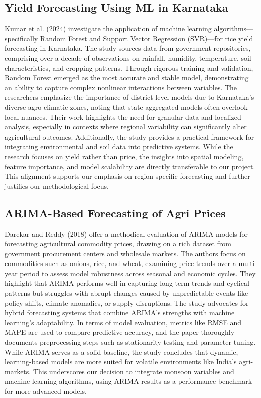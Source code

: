 \subsection{Yield Forecasting Using ML in Karnataka \cite{kumar2024yield}}
Kumar et al. (2024) investigate the application of machine learning algorithms—specifically Random Forest and Support Vector Regression (SVR)—for rice yield forecasting in Karnataka. The study sources data from government repositories, comprising over a decade of observations on rainfall, humidity, temperature, soil characteristics, and cropping patterns. Through rigorous training and validation, Random Forest emerged as the most accurate and stable model, demonstrating an ability to capture complex nonlinear interactions between variables. The researchers emphasize the importance of district-level models due to Karnataka's diverse agro-climatic zones, noting that state-aggregated models often overlook local nuances. Their work highlights the need for granular data and localized analysis, especially in contexts where regional variability can significantly alter agricultural outcomes. Additionally, the study provides a practical framework for integrating environmental and soil data into predictive systems. While the research focuses on yield rather than price, the insights into spatial modeling, feature importance, and model scalability are directly transferable to our project. This alignment supports our emphasis on region-specific forecasting and further justifies our methodological focus.

\subsection{ARIMA-Based Forecasting of Agri Prices \cite{darekar2018price}}
Darekar and Reddy (2018) offer a methodical evaluation of ARIMA models for forecasting agricultural commodity prices, drawing on a rich dataset from government procurement centers and wholesale markets. The authors focus on commodities such as onions, rice, and wheat, examining price trends over a multi-year period to assess model robustness across seasonal and economic cycles. They highlight that ARIMA performs well in capturing long-term trends and cyclical patterns but struggles with abrupt changes caused by unpredictable events like policy shifts, climate anomalies, or supply disruptions. The study advocates for hybrid forecasting systems that combine ARIMA's strengths with machine learning's adaptability. In terms of model evaluation, metrics like RMSE and MAPE are used to compare predictive accuracy, and the paper thoroughly documents preprocessing steps such as stationarity testing and parameter tuning. While ARIMA serves as a solid baseline, the study concludes that dynamic, learning-based models are more suited for volatile environments like India's agri-markets. This underscores our decision to integrate monsoon variables and machine learning algorithms, using ARIMA results as a performance benchmark for more advanced models.

